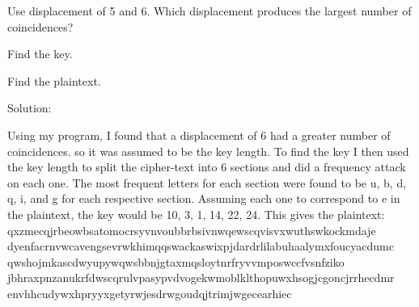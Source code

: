 \documentclass[12pt,letterpaper,final]{report}
\begin{document}
\bigskip
{}
\begin{alphalist}
	\item Use displacement of 5 and 6. Which displacement produces the largest number of coincidences?
	\item Find the key.
	\item Find the plaintext.
\end{alphalist}

\bigskip
\indent Solution: 
\bigskip

Using  my program, I found that a displacement of 6 had a greater number of coincidences. so it was assumed to be the key length. To find the key I then used the key length to split the cipher-text into 6 sections and did a frequency attack on each one.
 The most frequent letters for each section were found to be u, b, d, q, i, and g for each respective section. Assuming each one to correspond to e in the plaintext, the key would be 10, 3, 1, 14, 22, 24. This gives the plaintext:
\bigskip
\newline qxzmecqjrbeowbsatomocrsyvnvoubbrbsivnwqewscqvisvxwuthswkockmdaje 
\newline dyenfacrnvwcavengsevrwkhimqqswackaswixpjdardrlilabuhaalymxfoucyacdumc
\newline qwshojmkascdwyupywqwsbbnjgtaxmqsloytnrfryvvmposwccfvsnfziko
\newline jbhraxpnzanukrfdwscqrulvpasypvdvogekwmoblklthopuwxhsogjcgoncjrrhecdmr
\newline envhhcudywxhpryyxgetyrwjesdrwgoudqjtrimjwgecearhiec
\end{document}
